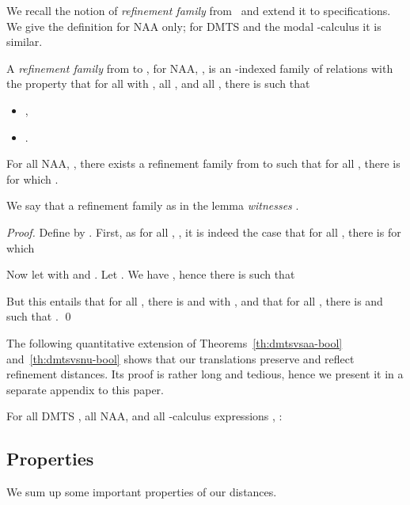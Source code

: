 \documentclass[twocolumn]{svjour3-dummy}
\newcommand*\NAA{NAA\xspace}
\begin{document}
We recall the notion of \emph{refinement family}
from~\cite[Def.~6]{DBLP:journals/acta/FahrenbergL14} and extend it to
specifications.  We give the definition for \NAA only; for DMTS and
the modal -calculus it is similar.

\begin{definition}
  \label{de:reffam}
  A \emph{refinement family} from  to , for \NAA , , is an
  -indexed family of relations  with the property that for all  with , all , and all
  , there is  such that
  \begin{itemize}
  \item ,
  \item .
  \end{itemize}
\end{definition}

\begin{lemma}
  For all \NAA , , there exists a refinement family  from  to
   such that for all , there is 
  for which .
\end{lemma}

We say that a refinement family as in the lemma \emph{witnesses} .

\begin{proof}
  Define  by .  First, as  for all , , it
  is indeed the case that for all , there is  for which
  

  Now let  with  and .  Let .  We have , hence there is 
  such that
  
  But this entails that for all , there is  and  with , and that for all ,
  there is  and  such that
  . \qed
\end{proof}

The following quantitative extension of Theorems~\ref{th:dmtsvsaa-bool}
and~\ref{th:dmtsvsnu-bool} shows that our translations preserve and
reflect refinement distances.  Its proof is rather long and tedious,
hence we present it in a separate appendix to this paper.

\begin{theorem}
  \label{th:trans-moddist}
  For all DMTS , all \NAA ,  and all
  -calculus expressions , :
  
\end{theorem}

\subsection{Properties}

We sum up some important properties of our distances.
\end{document}
